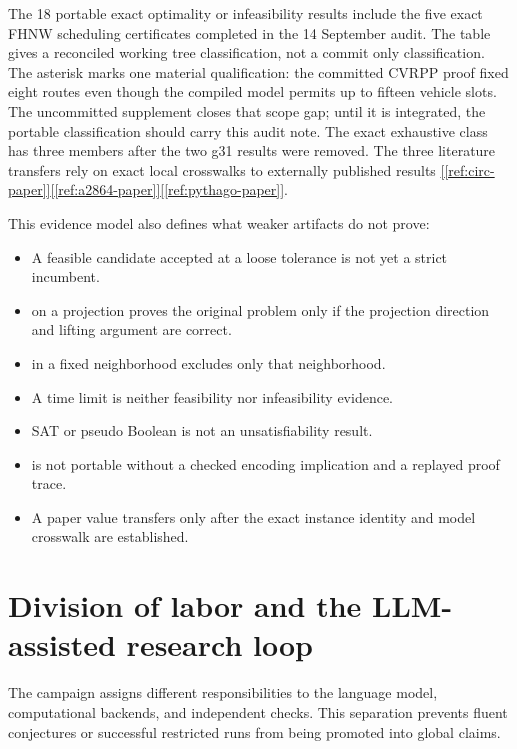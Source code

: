 \documentclass[11pt,letterpaper]{article}
\newcommand{\sourcecite}[1]{\hyperref[#1]{[\ref*{#1}]}}
\begin{document}
The 18 portable exact optimality or infeasibility results include the five exact FHNW scheduling certificates completed in the 14 September audit. The table gives a reconciled working tree classification, not a commit only classification. The asterisk marks one material qualification: the committed CVRPP proof fixed eight routes even though the compiled model permits up to fifteen vehicle slots. The uncommitted supplement closes that scope gap; until it is integrated, the portable classification should carry this audit note. The exact exhaustive class has three members after the two g31 results were removed. The three literature transfers rely on exact local crosswalks to externally published results \sourcecite{ref:circ-paper}\sourcecite{ref:a2864-paper}\sourcecite{ref:pythago-paper}.

This evidence model also defines what weaker artifacts do not prove:

\begin{itemize}
\item A feasible candidate accepted at a loose tolerance is not yet a strict incumbent.
\item \texttt{} on a projection proves the original problem only if the projection direction and lifting argument are correct.
\item \texttt{} in a fixed neighborhood excludes only that neighborhood.
\item A time limit is neither feasibility nor infeasibility evidence.
\item SAT or pseudo Boolean \texttt{} is not an unsatisfiability result.
\item \texttt{} is not portable without a checked encoding implication and a replayed proof trace.
\item A paper value transfers only after the exact instance identity and model crosswalk are established.
\end{itemize}

\section{Division of labor and the LLM-assisted research loop}

The campaign assigns different responsibilities to the language model, computational backends, and independent checks. This separation prevents fluent conjectures or successful restricted runs from being promoted into global claims.
\end{document}
